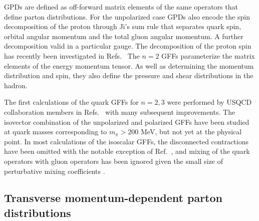GPDs are defined as  off-forward matrix elements of the same operators that define parton distributions. For the unpolarized case
GPDs also encode the spin decomposition of the proton through Ji's sum rule \cite{Ji:1996ek} that separates quark spin, orbital angular momentum and the total gluon angular momentum. 
A further decomposition valid in a particular gauge. The decomposition of the proton spin has recently been investigated in Refs.~\cite{Yang:2016plb,Alexandrou:2017oeh}
The $n=2$ GFFs  parameterize the matrix elements of the energy momentum tensor. As well as determining the momentum distribution and spin, they 
also define the pressure and shear distributions in the hadron\cite{Polyakov:2018zvc}.

The first calculations of the quark GFFs for $n=2,3$ were performed by USQCD collaboration members in Refs.~\cite{Hagler:2003jd} with many subsequent improvements. The isovector combination of the unpolarized and polarized GFFs have been studied at quark masses corresponding to $m_\pi>200$ MeV, but not yet at the physical point. In most calculations of the isoscalar GFFs, the disconnected contractions have been omitted with the notable exception of Ref.~\cite{Deka:2013zha}, and mixing of the quark operators with gluon operators has been ignored given the small size of perturbative mixing coefficients \cite{Alexandrou:2016ekb}. 



\subsection{Transverse momentum-dependent parton distributions}
\label{TMDs}



